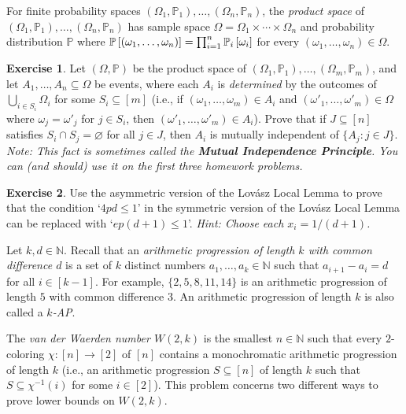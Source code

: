 \documentclass[11pt, letter]{amsart}
\theoremstyle{definition}
\newtheorem{exercise}{Exercise}[]
\newcommand{\Prob}[1]{\ensuremath{%
    \mathbb P\left[#1\right]
}}
\begin{document}
  For finite probability spaces $(\Omega_1, \mathbb P_1), \dots, (\Omega_n, \mathbb P_n)$, the \textit{product space} of $(\Omega_1, \mathbb P_1), \dots,(\Omega_n, \mathbb P_n)$ has sample space $\Omega = \Omega_1 \times \cdots \times \Omega_n$ and probability distribution $\mathbb P$ where $\Prob{(\omega_1,\dots, \omega_n)} = \prod_{i=1}^n \mathbb P_i\left[\omega_i\right]$ for every $(\omega_1, \dots, \omega_n) \in \Omega$.  
\begin{exercise}
Let $(\Omega, \mathbb P)$ be the product space of $(\Omega_1, \mathbb P_1), \dots, (\Omega_m, \mathbb P_m)$, and let $A_1, \dots, A_n \subseteq \Omega$ be events, where each $A_i$ is \textit{determined} by the outcomes of $\bigcup_{i\in S_i} \Omega_i$ for some $S_i \subseteq [m]$ (i.e., if $(\omega_1, \dots, \omega_m) \in A_i$ and $(\omega'_1, \dots, \omega'_m) \in \Omega$ where $\omega_j = \omega'_j$ for $j \in S_i$, then $(\omega'_1, \dots, \omega'_m) \in A_i$).  Prove that if $J \subseteq [n]$ satisfies $S_i \cap S_j = \varnothing$ for all $j \in J$, then $A_i$ is mutually independent of $\{A_j : j \in J\}$.  \textit{Note: This fact is sometimes called the \textbf{Mutual Independence Principle}.  You can (and should) use it on the first three homework problems.}
\end{exercise}

\begin{exercise}
  Use the asymmetric version of the Lov\'asz Local Lemma to prove that the condition `$4pd \leq 1$' in the symmetric version of the Lov\'asz Local Lemma can be replaced with `$ep(d + 1)\leq1$'.  \textit{Hint: Choose each $x_i = 1 / (d + 1)$.}
\end{exercise}

\clearpage

Let $k,d \in \mathbb N$.  Recall that an \textit{arithmetic progression of length $k$ with common difference $d$} is a set of $k$ distinct numbers $a_1, \dots, a_k \in \mathbb N$ such that $a_{i+1} - a_i = d$ for all $i\in[k-1]$.  For example, $\{2, 5, 8, 11, 14\}$ is an arithmetic progression of length $5$ with common difference $3$.  An arithmetic progression of length $k$ is also called a \textit{$k$-AP}.

The \textit{van der Waerden number $W(2, k)$} is the smallest $n \in \mathbb N$ such that every $2$-coloring $\chi : [n] \rightarrow [2]$ of $[n]$ contains a monochromatic arithmetic progression of length $k$ (i.e., an arithmetic progression $S \subseteq [n]$ of length $k$ such that $S \subseteq \chi^{-1}(i)$ for some $i \in [2]$).  This problem concerns two different ways to prove lower bounds on $W(2, k)$.
\end{document}
